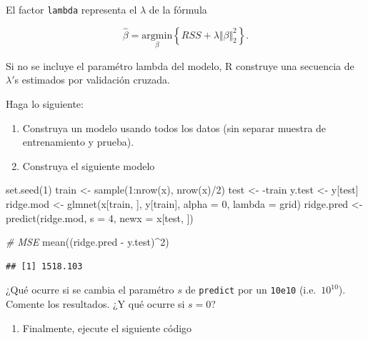 \documentclass[
  12pt,
]{book}
\newenvironment{Shaded}{\begin{snugshade}}{\end{snugshade}}
\newcommand{\AttributeTok}[1]{\textcolor[rgb]{0.77,0.63,0.00}{#1}}
\newcommand{\CommentTok}[1]{\textcolor[rgb]{0.56,0.35,0.01}{\textit{#1}}}
\newcommand{\DecValTok}[1]{\textcolor[rgb]{0.00,0.00,0.81}{#1}}
\newcommand{\FunctionTok}[1]{\textcolor[rgb]{0.00,0.00,0.00}{#1}}
\newcommand{\NormalTok}[1]{#1}
\newcommand{\OtherTok}[1]{\textcolor[rgb]{0.56,0.35,0.01}{#1}}
\newcommand{\SpecialCharTok}[1]{\textcolor[rgb]{0.00,0.00,0.00}{#1}}
\providecommand{\tightlist}{%
  \setlength{\itemsep}{0pt}\setlength{\parskip}{0pt}}
\theoremstyle{definition}
\theoremstyle{definition}
\theoremstyle{definition}
\theoremstyle{definition}
\theoremstyle{remark}
\begin{document}
El factor \texttt{lambda} representa el \(\lambda\) de la fórmula

\[ \hat{\beta} = \underset{\beta}{\mathrm{argmin}} \left\{RSS + \lambda \Vert \beta \Vert_2^2\right\}.\]

Si no se incluye el paramétro lambda del modelo, R construye una secuencia de \(\lambda'\)s estimados por validación cruzada.

Haga lo siguiente:

\begin{enumerate}
\def\labelenumi{\arabic{enumi}.}
\item
  Construya un modelo usando todos los datos (sin separar muestra de entrenamiento y prueba).
\item
  Construya el siguiente modelo
\end{enumerate}

\begin{Shaded}
\begin{Highlighting}[]
\FunctionTok{set.seed}\NormalTok{(}\DecValTok{1}\NormalTok{)}
\NormalTok{train }\OtherTok{\textless{}{-}} \FunctionTok{sample}\NormalTok{(}\DecValTok{1}\SpecialCharTok{:}\FunctionTok{nrow}\NormalTok{(x), }\FunctionTok{nrow}\NormalTok{(x)}\SpecialCharTok{/}\DecValTok{2}\NormalTok{)}
\NormalTok{test }\OtherTok{\textless{}{-}} \SpecialCharTok{{-}}\NormalTok{train}
\NormalTok{y.test }\OtherTok{\textless{}{-}}\NormalTok{ y[test]}
\NormalTok{ridge.mod }\OtherTok{\textless{}{-}} \FunctionTok{glmnet}\NormalTok{(x[train, ], y[train], }\AttributeTok{alpha =} \DecValTok{0}\NormalTok{,}
    \AttributeTok{lambda =}\NormalTok{ grid)}
\NormalTok{ridge.pred }\OtherTok{\textless{}{-}} \FunctionTok{predict}\NormalTok{(ridge.mod, }\AttributeTok{s =} \DecValTok{4}\NormalTok{, }\AttributeTok{newx =}\NormalTok{ x[test,}
\NormalTok{    ])}

\CommentTok{\# MSE}
\FunctionTok{mean}\NormalTok{((ridge.pred }\SpecialCharTok{{-}}\NormalTok{ y.test)}\SpecialCharTok{\^{}}\DecValTok{2}\NormalTok{)}
\end{Highlighting}
\end{Shaded}

\begin{verbatim}
## [1] 1518.103
\end{verbatim}

¿Qué ocurre si se cambia el paramétro \(s\) de \texttt{predict} por un \texttt{10e10} (i.e.~\(10^{10}\)). Comente los resultados. ¿Y qué ocurre si \(s=0\)?

\begin{enumerate}
\def\labelenumi{\arabic{enumi}.}
\setcounter{enumi}{2}
\tightlist
\item
  Finalmente, ejecute el siguiente código
\end{enumerate}
\end{document}
